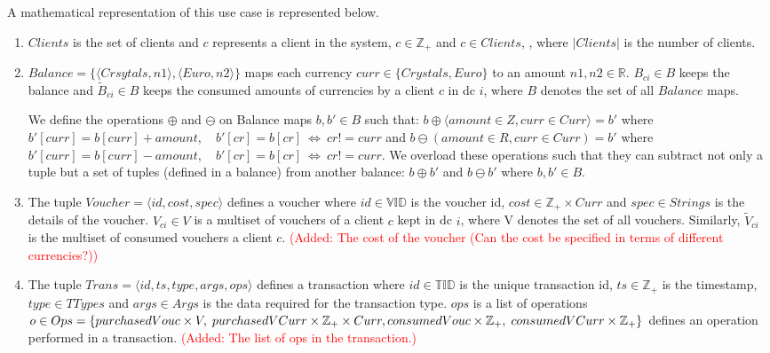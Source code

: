 A mathematical representation of this use case is represented below.
\begin{enumerate}

	\item $Clients$ is the set of clients and $c$ represents a client in the system, $c \in \mathbb{Z}_{+}$ and $c \in Clients$, , where $|Clients|$ is the number of clients.

	\item $Balance = \{ \langle Crsytals, n1 \rangle, \langle Euro, n2 \rangle \}$ maps each currency $curr \in \{Crystals, Euro\}$ to an amount $n1, n2 \in \mathbb{R}$. $B_{ci} \in B$ keeps the balance and $\widetilde{B}_{ci} \in B$ keeps the consumed amounts of currencies by a client $c$ in \gls{dc} $i$, where $B$ denotes the set of all $Balance$ maps.

	We define the operations $\oplus$ and $\ominus$ on Balance maps $b, b' \in B$ such that: $b \oplus \langle amount \in Z, curr \in Curr \rangle = b'$ where $b'[curr] = b[curr] + amount$,  ~  $b'[cr] = b[cr]  ~ \iff  ~  cr != curr$ and $b \ominus(amount \in R, curr \in Curr) = b'$ where $b'[curr] = b[curr] - amount$,  ~  $b'[cr] = b[cr]  ~  \iff  ~  cr != curr$. We overload these operations such that they can subtract not only a tuple but a set of tuples (defined in a balance) from another balance: $b \oplus b'$ and $b \ominus b'$ where $b, b' \in B$.  
	
	\item The tuple $Voucher = \langle id, cost, spec \rangle$ defines a voucher where $id \in \mathbb{VID}$  is the voucher \gls{id}, $cost \in \mathbb{Z}_{+} \times Curr$ and $spec \in Strings$ is the details of the voucher. $V_{ci} \in V$ is a multiset of vouchers of a client $c$ kept in \gls{dc} $i$, where V denotes the set of all vouchers. Similarly, $\widetilde{V}_{ci}$ is the multiset of consumed vouchers a client $c$.
	\textcolor{red}{(Added: The cost of the voucher (Can the cost be specified in terms of different currencies?))}
	
	\item The tuple $Trans = \langle id, ts, type, args, ops \rangle$ defines a transaction where $id \in \mathbb{TID}$ is the unique transaction \gls{id}, $ts \in \mathbb{Z}_{+}$ is the timestamp, $type \in TTypes$ and $args \in Args$ is the data required for the transaction type.  $ops$ is a list of operations $o \in Ops = \{ purchasedVouc \times V, \; purchasedVCurr \times \mathbb{Z}_{+} \times Curr, \\ consumedVouc \times \mathbb{Z}_{+}, \; consumedVCurr \times \mathbb{Z}_{+} \}$ defines an operation performed in a transaction. \textcolor{red}{(Added: The list of ops in the transaction.)}
 	

\end{enumerate}
